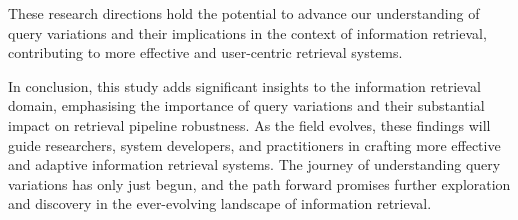 These research directions hold the potential to advance our understanding of query variations and their implications in the context of information retrieval, contributing to more effective and user-centric retrieval systems.

In conclusion, this study adds significant insights to the information retrieval domain, emphasising the importance of query variations and their substantial impact on retrieval pipeline robustness. As the field evolves, these findings will guide researchers, system developers, and practitioners in crafting more effective and adaptive information retrieval systems. The journey of understanding query variations has only just begun, and the path forward promises further exploration and discovery in the ever-evolving landscape of information retrieval.
